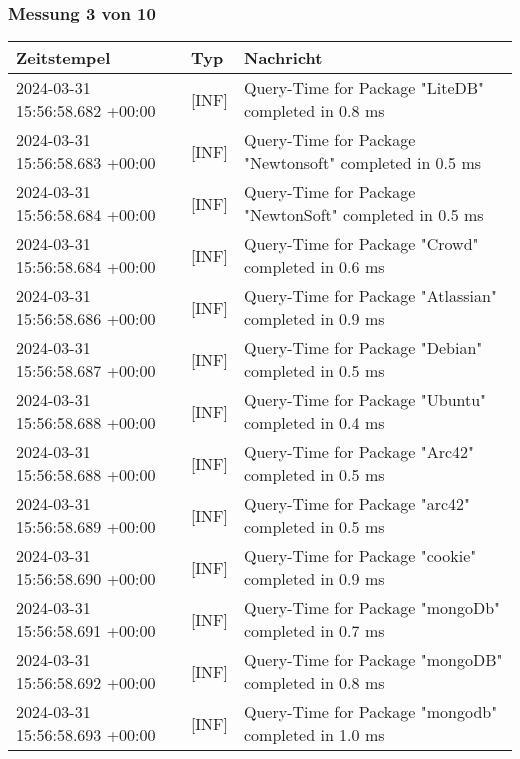     \subsubsection{Messung 3 von 10} \label{subsubsec:MySQLMitIndex3von10}
        {
            {\small
                \begin{tabularx}{\textwidth}{|l|l|X|}
                    \hline
                    \textbf{Zeitstempel} & \textbf{Typ} & \textbf{Nachricht} \\
                    \hline
                    \endhead
                    2024-03-31 15:56:58.682 +00:00 & [INF] & Query-Time for Package "LiteDB" completed in 0.8 ms \\
                    2024-03-31 15:56:58.683 +00:00 & [INF] & Query-Time for Package "Newtonsoft" completed in 0.5 ms \\
                    2024-03-31 15:56:58.684 +00:00 & [INF] & Query-Time for Package "NewtonSoft" completed in 0.5 ms \\
                    2024-03-31 15:56:58.684 +00:00 & [INF] & Query-Time for Package "Crowd" completed in 0.6 ms \\
                    2024-03-31 15:56:58.686 +00:00 & [INF] & Query-Time for Package "Atlassian" completed in 0.9 ms \\
                    2024-03-31 15:56:58.687 +00:00 & [INF] & Query-Time for Package "Debian" completed in 0.5 ms \\
                    2024-03-31 15:56:58.688 +00:00 & [INF] & Query-Time for Package "Ubuntu" completed in 0.4 ms \\
                    2024-03-31 15:56:58.688 +00:00 & [INF] & Query-Time for Package "Arc42" completed in 0.5 ms \\
                    2024-03-31 15:56:58.689 +00:00 & [INF] & Query-Time for Package "arc42" completed in 0.5 ms \\
                    2024-03-31 15:56:58.690 +00:00 & [INF] & Query-Time for Package "cookie" completed in 0.9 ms \\
                    2024-03-31 15:56:58.691 +00:00 & [INF] & Query-Time for Package "mongoDb" completed in 0.7 ms \\
                    2024-03-31 15:56:58.692 +00:00 & [INF] & Query-Time for Package "mongoDB" completed in 0.8 ms \\
                    2024-03-31 15:56:58.693 +00:00 & [INF] & Query-Time for Package "mongodb" completed in 1.0 ms \\

\end{tabularx}}}

